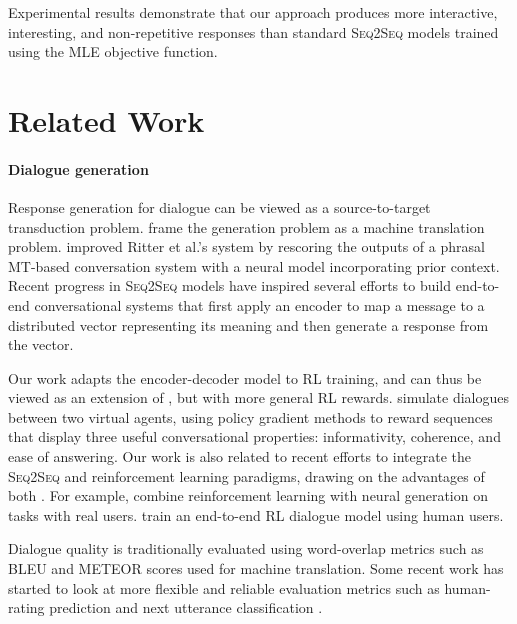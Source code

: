\documentclass[11pt]{article}
\newcommand{\sts}{{{\textsc{Seq2Seq}}}\xspace}
\begin{document}
Experimental results demonstrate that our approach
produces more interactive, interesting, and non-repetitive responses than standard
\sts models trained using the MLE objective function.
\begin{comment}
The rest of this paper is organized as follows: we  go over related work in Section 2. 
We describe the proposed  model in Section 4. Experimental results are presented in Section 5 and we conclude this paper in Section 6. 
\end{comment}
 
\section{Related Work}
\paragraph{Dialogue generation}
Response generation for dialogue can be viewed as 
 a source-to-target transduction problem.
frame the generation problem as a machine translation problem.  
improved Ritter et al.'s system 
by rescoring
the outputs of a phrasal MT-based conversation
system with a neural model incorporating
prior context.
Recent progress in \sts models have inspired several efforts \cite{vinyals2015neural,serban2015hierarchical,serban2016,luan2016lstm} to  build end-to-end conversational systems that first apply an encoder to map a message to a distributed vector representing its meaning and then generate a response from the vector.

Our work adapts the encoder-decoder model to RL training, and can thus be viewed as an extension of
 , but with more general RL rewards.   
simulate dialogues
between two virtual agents, using policy gradient
methods to reward sequences that display
three useful conversational properties: informativity,
coherence, and ease of answering. 
 Our work is also
related to recent efforts to
 integrate the \sts and reinforcement learning  paradigms, drawing on the advantages of both \cite{wen2016network}.
For example,   combine reinforcement learning with neural generation on tasks with real users.
 train an end-to-end RL dialogue model using  human users.  

Dialogue quality is traditionally evaluated \cite[e.g.]{sordoni2015neural} using word-overlap metrics such as BLEU and METEOR scores used for machine translation.  
 Some recent work \cite{liu2016not} has started to look at more flexible and reliable evaluation metrics 
 such as human-rating prediction \cite{hey} and next utterance classification \cite{lowe2016evaluation}.
\end{document}
